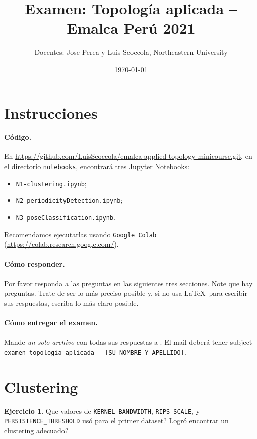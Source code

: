\documentclass[12pt,reqno,oneside]{article}
\title{Examen: Topolog\'{i}a aplicada -- Emalca Per\'{u} 2021}
\date{\today}
\author{Docentes: Jose Perea y Luis Scoccola, Northeastern University}
\theoremstyle{definition}
\newtheorem{pregunta}[theorem]{Ejercicio}
\begin{document}
\maketitle

\section{Instrucciones}

\paragraph{C\'odigo.}
En \url{https://github.com/LuisScoccola/emalca-applied-topology-minicourse.git}, en el directorio \texttt{notebooks}, encontrar\'a tres Jupyter Notebooks:
\begin{itemize}
	\item \texttt{N1-clustering.ipynb};
	\item \texttt{N2-periodicityDetection.ipynb};
	\item \texttt{N3-poseClassification.ipynb}.
\end{itemize}
Recomendamos ejecutarlas usando \texttt{Google Colab} (\url{https://colab.research.google.com/}).

\paragraph{C\'omo responder.}
Por favor responda a las preguntas en las siguientes tres secciones.
Note que hay  preguntas.
Trate de ser lo m\'as preciso posible y, si no usa \LaTeX~para escribir sus respuestas, escriba lo m\'as claro posible.

\paragraph{C\'omo entregar el examen.}
Mande \textit{un solo archivo} con todas sus respuestas a .
El mail deber\'a tener subject \texttt{examen topologia aplicada -- [SU NOMBRE Y APELLIDO]}.

\section{Clustering}
\begin{pregunta}
	Que valores de \texttt{KERNEL\_BANDWIDTH}, \texttt{RIPS\_SCALE}, y \texttt{PERSISTENCE\_THRESHOLD} us\'o para el primer dataset?
	Logr\'o encontrar un clustering adecuado?
\end{pregunta}
\end{document}
